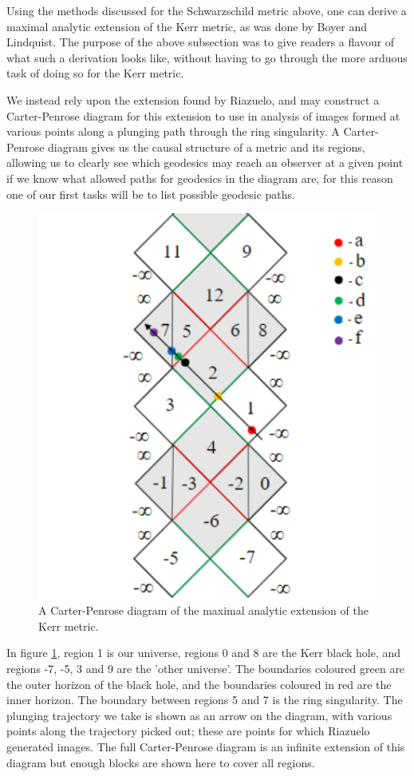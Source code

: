 \documentclass[oneside,openright,frontopenright, singlespacing]{dmathesis}
\begin{document}
	Using the methods discussed for the Schwarzschild metric above, one can derive a maximal analytic extension of the Kerr metric, as was done by Boyer and Lindquist. The purpose of the above subsection was to give readers a flavour of what such a derivation looks like, without having to go through the more arduous task of doing so for the Kerr metric. 

\vspace{1em}
	We instead rely upon the extension found by Riazuelo\cite{seeingRelativity}, and may construct a Carter-Penrose diagram for this extension to use in analysis of images formed at various points along a plunging path through the ring singularity. A Carter-Penrose diagram gives us the causal structure of a metric and its regions, allowing us to clearly see which geodesics may reach an observer at a given point if we know what allowed paths for geodesics in the diagram are, for this reason one of our first tasks will be to list possible geodesic paths.

\vspace{1em}
\begin{figure}[!ht]
	\centering
	\includegraphics[width=0.5\linewidth]{img/carter-penrose-kerr}
	\caption{A Carter-Penrose diagram of the maximal analytic extension of the Kerr metric.}
	\label{fig:Figure6.2}
\end{figure}

\vspace{1em}
	In figure \ref{fig:Figure6.2}, region 1 is our universe, regions 0 and 8 are the Kerr black hole, and regions -7, -5, 3 and 9 are the 'other universe'. The boundaries coloured green are the outer horizon of the black hole, and the boundaries coloured in red are the inner horizon. The boundary between regions 5 and 7 is the ring singularity. The plunging trajectory we take is shown as an arrow on the diagram, with various points along the trajectory picked out; these are points for which Riazuelo generated images. The full Carter-Penrose diagram is an infinite extension of this diagram but enough blocks are shown here to cover all regions.
\end{document}
